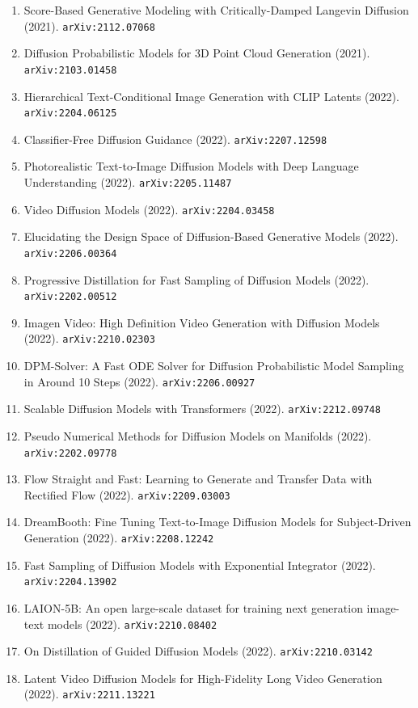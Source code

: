 \documentclass[11pt]{article}
\begin{document}
\begin{enumerate}
  Distributions (2021). \texttt{arXiv:2102.05379}
  \item Score-Based Generative Modeling with Critically-Damped Langevin
  Diffusion (2021). \texttt{arXiv:2112.07068}
  \item Diffusion Probabilistic Models for 3D Point Cloud Generation (2021). \texttt{arXiv:2103.01458}
  \item Hierarchical Text-Conditional Image Generation with CLIP Latents (2022). \texttt{arXiv:2204.06125}
  \item Classifier-Free Diffusion Guidance (2022). \texttt{arXiv:2207.12598}
  \item Photorealistic Text-to-Image Diffusion Models with Deep Language
  Understanding (2022). \texttt{arXiv:2205.11487}
  \item Video Diffusion Models (2022). \texttt{arXiv:2204.03458}
  \item Elucidating the Design Space of Diffusion-Based Generative Models (2022). \texttt{arXiv:2206.00364}
  \item Progressive Distillation for Fast Sampling of Diffusion Models (2022). \texttt{arXiv:2202.00512}
  \item Imagen Video: High Definition Video Generation with Diffusion Models (2022). \texttt{arXiv:2210.02303}
  \item DPM-Solver: A Fast ODE Solver for Diffusion Probabilistic Model Sampling
  in Around 10 Steps (2022). \texttt{arXiv:2206.00927}
  \item Scalable Diffusion Models with Transformers (2022). \texttt{arXiv:2212.09748}
  \item Pseudo Numerical Methods for Diffusion Models on Manifolds (2022). \texttt{arXiv:2202.09778}
  \item Flow Straight and Fast: Learning to Generate and Transfer Data with
  Rectified Flow (2022). \texttt{arXiv:2209.03003}
  \item DreamBooth: Fine Tuning Text-to-Image Diffusion Models for
  Subject-Driven Generation (2022). \texttt{arXiv:2208.12242}
  \item Fast Sampling of Diffusion Models with Exponential Integrator (2022). \texttt{arXiv:2204.13902}
  \item LAION-5B: An open large-scale dataset for training next generation
  image-text models (2022). \texttt{arXiv:2210.08402}
  \item On Distillation of Guided Diffusion Models (2022). \texttt{arXiv:2210.03142}
  \item Latent Video Diffusion Models for High-Fidelity Long Video Generation (2022). \texttt{arXiv:2211.13221}

\end{enumerate}
\end{document}
